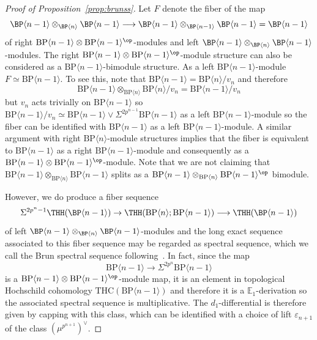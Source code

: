 \begin{proof}[Proof of Proposition~\ref{prop:brunss}]
Let $F$ denote the fiber of the map 
\[ 
\BP\langle n-1\rangle\otimes_{\BP\langle n\rangle}\BP\langle n-1\rangle \longrightarrow \BP\langle n-1\rangle \otimes_{\BP\langle n-1\rangle}\BP\langle n-1\rangle =\BP\langle n-1\rangle 
\]
of right $\mathrm{BP}\langle n-1\rangle \otimes \mathrm{BP}\langle n-1\rangle^{\op}$-modules and left $\BP\langle n-1\rangle\otimes_{\BP\langle n\rangle}\BP\langle n-1\rangle$-modules. The right $\mathrm{BP}\langle n-1\rangle \otimes \mathrm{BP}\langle n-1\rangle^{\op}$-module structure can also be considered as a $\mathrm{BP}\langle n-1\rangle$-bimodule structure. As a left $\mathrm{BP}\langle n-1\rangle$-module $F\simeq \mathrm{BP}\langle n-1\rangle$. To see this, note that $\mathrm{BP}\langle n-1 \rangle=\mathrm{BP}\langle n\rangle/v_n$ and therefore 
\[ \mathrm{BP}\langle n-1 \rangle\otimes_{\mathrm{BP}\langle n\rangle} \mathrm{BP}\langle n\rangle/v_n=\mathrm{BP}\langle n-1 \rangle/v_n\]
but $v_n$ acts trivially on $\mathrm{BP}\langle n-1 \rangle$ so $\mathrm{BP}\langle n-1 \rangle/v_n\simeq \mathrm{BP}\langle n-1 \rangle\vee \Sigma^{2p^{n-1}}\mathrm{BP}\langle n-1 \rangle$ as a left $\mathrm{BP}\langle n-1 \rangle$-module so the fiber can be identified with $\mathrm{BP}\langle n-1 \rangle$ as a left $\mathrm{BP}\langle n-1 \rangle$-module. A similar argument with right 
$\mathrm{BP}\langle n\rangle$-module structures implies that the fiber is equivalent to $\mathrm{BP}\langle n-1\rangle$ as a right $\mathrm{BP}\langle n-1\rangle$-module and consequently as a $\mathrm{BP}\langle n-1\rangle\otimes \mathrm{BP}\langle n-1\rangle^{\op}$-module. Note that we are not claiming that $\mathrm{BP}\langle n-1\rangle \otimes_{\mathrm{BP}\langle n\rangle}\mathrm{BP}\langle n-1\rangle$ splits as a $\mathrm{BP}\langle n-1\rangle \otimes_{\mathrm{BP}\langle n\rangle}\mathrm{BP}\langle n-1\rangle^{\op}$ bimodule. 

However, we do produce a fiber sequence 
\[ 
\Sigma^{2p^{n}-1}\THH(\BP\langle n-1 \rangle)\to  \THH( \mathrm{BP}\langle n \rangle;\mathrm{BP}\langle n-1 \rangle)\longrightarrow \THH(\BP\langle n-1 \rangle)
\]
of left $\BP\langle n-1\rangle \otimes_{\BP\langle n \rangle }\BP\langle n-1\rangle $-modules 
and the long exact sequence associated to this fiber sequence may be regarded as spectral sequence, which we call the Brun spectral sequence following~\cite{Hon20}. In fact, since the map 
\[ \mathrm{BP}\langle n-1\rangle \to \Sigma^{2p^{n}}\mathrm{BP}\langle n-1\rangle 
\]
is a $\mathrm{BP}\langle n-1\rangle \otimes \mathrm{BP}\langle n-1\rangle^{\op}$-module map, it is an element in topological Hochschild cohomology $\mathrm{THC}(\mathrm{BP}\langle n-1\rangle)$ and therefore it is a $\mathbb{E}_1$-derivation so the associated spectral sequence is multiplicative. The $d_1$-differential is therefore given by capping with this class, which can be identified with a choice of lift $\varepsilon_{n+1}$ of the class $(\mu^{p^{n+1}})^{\vee}$. 
\end{proof}
